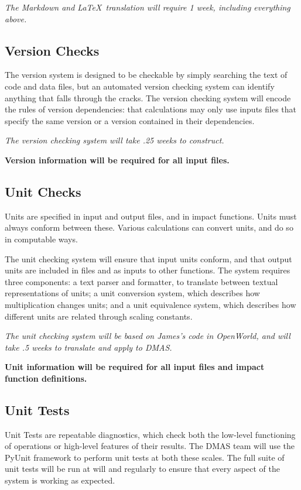 \documentclass[12pt, oneside]{amsart}
\begin{document}
{\it The Markdown and \LaTeX\ translation will require 1 week, including everything above.}

\subsection{Version Checks}
\label{sec:versioncheck}

The version system is designed to be checkable by simply searching the
text of code and data files, but an automated version checking system
can identify anything that falls through the cracks.  The version
checking system will encode the rules of version dependencies: that
calculations may only use inputs files that specify the same version
or a version contained in their dependencies.

{\it The version checking system will take .25 weeks to construct.}

{\bf Version information will be required for all input files.}

\subsection{Unit Checks}
\label{sec:unitchecks}

Units are specified in input and output files, and in impact
functions.  Units must always conform between these.  Various
calculations can convert units, and do so in computable ways.

The unit checking system will ensure that input units conform, and
that output units are included in files and as inputs to other
functions.  The system requires three components: a text parser and
formatter, to translate between textual representations of units; a
unit conversion system, which describes how multiplication changes
units; and a unit equivalence system, which describes how different
units are related through scaling constants.

{\it The unit checking system will be based on James's code in
  OpenWorld, and will take .5 weeks to translate and apply to DMAS.}

{\bf Unit information will be required for all input files and impact function definitions.}

\subsection{Unit Tests}
\label{sec:unittest}

Unit Tests are repeatable diagnostics, which check both the low-level
functioning of operations or high-level features of their results.
The DMAS team will use the PyUnit framework to perform unit tests at
both these scales.  The full suite of unit tests will be run at will
and regularly to ensure that every aspect of the system is working as
expected.
\end{document}
